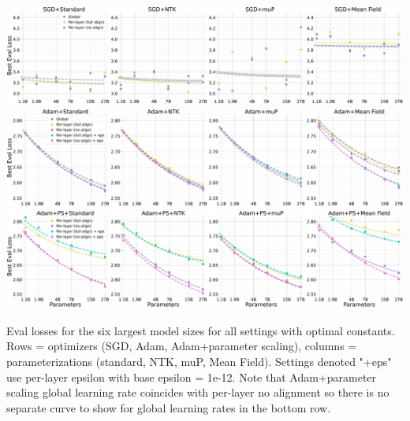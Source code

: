 \documentclass{article}
\theoremstyle{plain}
\theoremstyle{definition}
\theoremstyle{remark}
\begin{document}
\clearpage

\thispagestyle{plain}
\begin{SidewaysFigure}
\includegraphics[width=\linewidth, trim={0, 0, 0, 0},clip]{icml2024/figures/per_layer_lr_appendix/sgd_appendix_grid.pdf}
\includegraphics[width=\linewidth, trim={0, 0, 0, 0},clip]{icml2024/figures/per_layer_lr_appendix/adamw_appendix_grid.pdf}
\includegraphics[width=\linewidth, trim={0, 0, 0, 0},clip]{icml2024/figures/per_layer_lr_appendix/adam_ps_appendix_grid.pdf}
\caption{Eval losses for the six largest model sizes for all settings with optimal constants. Rows = optimizers (SGD, Adam, Adam+parameter scaling), columns = parameterizations (standard, NTK, muP, Mean Field). Settings denoted "+eps" use per-layer epsilon with base epsilon = 1e-12. Note that Adam+parameter scaling global learning rate coincides with per-layer no alignment so there is no separate curve to show for global learning rates in the bottom row.}
\label{fig:app_scaling_optimal_constants}
\end{SidewaysFigure}
\clearpage
\end{document}
